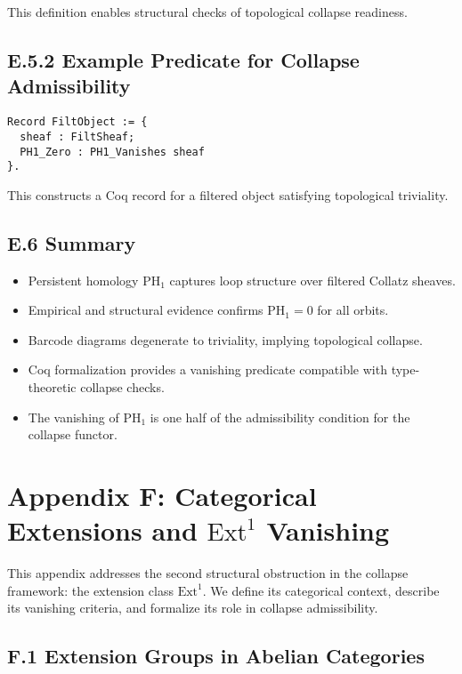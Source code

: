 \documentclass[11pt]{article}
\begin{document}
This definition enables structural checks of topological collapse readiness.

\subsection*{E.5.2 Example Predicate for Collapse Admissibility}

\begin{lstlisting}[language=Coq]
Record FiltObject := {
  sheaf : FiltSheaf;
  PH1_Zero : PH1_Vanishes sheaf
}.
\end{lstlisting}

This constructs a Coq record for a filtered object satisfying topological triviality.

\subsection*{E.6 Summary}

\begin{itemize}
  \item Persistent homology \( \mathrm{PH}_1 \) captures loop structure over filtered Collatz sheaves.
  \item Empirical and structural evidence confirms \( \mathrm{PH}_1 = 0 \) for all orbits.
  \item Barcode diagrams degenerate to triviality, implying topological collapse.
  \item Coq formalization provides a vanishing predicate compatible with type-theoretic collapse checks.
  \item The vanishing of \( \mathrm{PH}_1 \) is one half of the admissibility condition for the collapse functor.
\end{itemize}



\appendix
\section*{Appendix F: Categorical Extensions and \( \mathrm{Ext}^1 \) Vanishing}

This appendix addresses the second structural obstruction in the collapse framework: the extension class \( \mathrm{Ext}^1 \). We define its categorical context, describe its vanishing criteria, and formalize its role in collapse admissibility.

\subsection*{F.1 Extension Groups in Abelian Categories}
\end{document}
